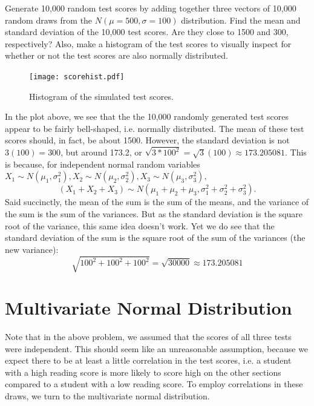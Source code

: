 \begin{problem}
Generate 10,000 random test scores by adding together three vectors of 10,000 random draws from the $N(\mu=500,\sigma=100)$ distribution. 
Find the mean and standard deviation of the 10,000 test scores. 
Are they close to 1500 and 300, respectively? 
Also, make a histogram of the test scores to visually inspect for whether or not the test scores are also normally distributed.
\end{problem}

\begin{figure}[h]
\centering
\texttt{[image: scorehist.pdf]}
\caption{Histogram of the simulated test scores.}
\end{figure}

In the plot above, we see that the the 10,000 randomly generated test scores appear to be fairly bell-shaped, i.e. normally distributed. 
The mean of these test scores should, in fact, be about 1500. 
However, the standard deviation is not $3(100) = 300$, but around 173.2, or $\sqrt{3*100^2}=\sqrt{3}(100) \approx 173.205081$. 
This is because, for independent normal random variables $X_1 \sim N(\mu_1,\sigma^2_1), X_2 \sim N(\mu_2,\sigma^2_2),X_3 \sim N(\mu_3,\sigma^2_3),$
 $$ (X_1 +X_2 +X_3) \sim N(\mu_1+\mu_2+\mu_3, \sigma^2_1+\sigma^2_2+\sigma^2_3).$$
Said succinctly, the mean of the sum is the sum of the means, and the variance of the sum is the sum of the variances. 
But as the standard deviation is the square root of the variance, this same idea doesn't work. 
Yet we do see that the standard deviation of the sum is the square root of the sum of the variances (the new variance):
 $$\sqrt{100^2+100^2+100^2} = \sqrt{30000} \approx 173.205081$$

\section*{Multivariate Normal Distribution}
Note that in the above problem, we assumed that the scores of all three tests were independent. 
This should seem like an unreasonable assumption, because we expect there to be at least a little correlation in the test scores, 
i.e. a student with a high reading score is more likely to score high on the other sections compared to a student with a low reading score. 
To employ correlations in these draws, we turn to the multivariate normal distribution. 
 
